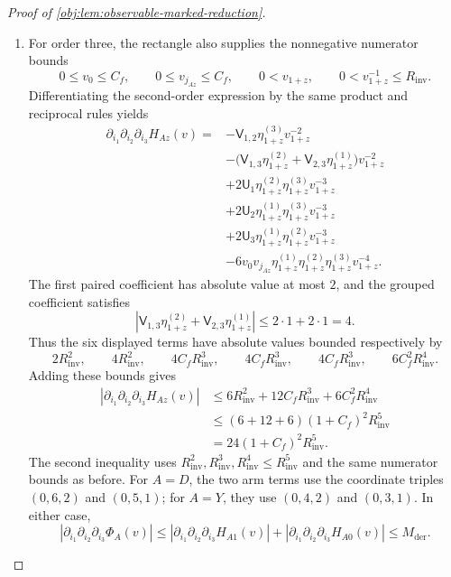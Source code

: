 \documentclass[11pt]{article}
\begin{document}
\begin{proof}[Proof of \cref{obj:lem:observable-marked-reduction}]
\begin{enumerate}
\item For order three, the rectangle also supplies the nonnegative numerator bounds
\[
0\le v_0\le C_f,\qquad
0\le v_{j_{Az}}\le C_f,
\qquad
0<v_{1+z},\qquad
0<v_{1+z}^{-1}\le R_{\mathrm{inv}}.
\]
Differentiating the second-order expression by the same product and reciprocal rules yields
\[
\begin{aligned}
\partial_{i_1}\partial_{i_2}\partial_{i_3}H_{Az}(v)
={}&-\mathsf V_{1,2}\eta^{(3)}_{1+z}v_{1+z}^{-2}\\
&-\bigl(\mathsf V_{1,3}\eta^{(2)}_{1+z}
       +\mathsf V_{2,3}\eta^{(1)}_{1+z}\bigr)v_{1+z}^{-2}\\
&+2\mathsf U_1\eta^{(2)}_{1+z}\eta^{(3)}_{1+z}v_{1+z}^{-3}\\
&+2\mathsf U_2\eta^{(1)}_{1+z}\eta^{(3)}_{1+z}v_{1+z}^{-3}\\
&+2\mathsf U_3\eta^{(1)}_{1+z}\eta^{(2)}_{1+z}v_{1+z}^{-3}\\
&-6v_0v_{j_{Az}}\eta^{(1)}_{1+z}
                    \eta^{(2)}_{1+z}\eta^{(3)}_{1+z}v_{1+z}^{-4}.
\end{aligned}
\]
The first paired coefficient has absolute value at most \(2\), and the grouped coefficient satisfies
\[
\left|\mathsf V_{1,3}\eta^{(2)}_{1+z}
       +\mathsf V_{2,3}\eta^{(1)}_{1+z}\right|
\le2\cdot1+2\cdot1=4.
\]
Thus the six displayed terms have absolute values bounded respectively by
\[
2R_{\mathrm{inv}}^2,\qquad
4R_{\mathrm{inv}}^2,\qquad
4C_fR_{\mathrm{inv}}^3,\qquad
4C_fR_{\mathrm{inv}}^3,\qquad
4C_fR_{\mathrm{inv}}^3,\qquad
6C_f^2R_{\mathrm{inv}}^4.
\]
Adding these bounds gives
\[
\begin{aligned}
|\partial_{i_1}\partial_{i_2}\partial_{i_3}H_{Az}(v)|
&\le6R_{\mathrm{inv}}^2
    +12C_fR_{\mathrm{inv}}^3
    +6C_f^2R_{\mathrm{inv}}^4\\
&\le(6+12+6)(1+C_f)^2R_{\mathrm{inv}}^5\\
&=24(1+C_f)^2R_{\mathrm{inv}}^5.
\end{aligned}
\]
The second inequality uses \(R_{\mathrm{inv}}^2,R_{\mathrm{inv}}^3,
R_{\mathrm{inv}}^4\le R_{\mathrm{inv}}^5\) and the same numerator bounds as before. For \(A=D\), the two arm terms use the coordinate triples \((0,6,2)\) and \((0,5,1)\); for \(A=Y\), they use \((0,4,2)\) and \((0,3,1)\). In either case,
\[
|\partial_{i_1}\partial_{i_2}\partial_{i_3}\Phi_A(v)|
\le|\partial_{i_1}\partial_{i_2}\partial_{i_3}H_{A1}(v)|
  +|\partial_{i_1}\partial_{i_2}\partial_{i_3}H_{A0}(v)|
\le M_{\mathrm{der}}.
\]


\end{enumerate}
\end{proof}
\end{document}
